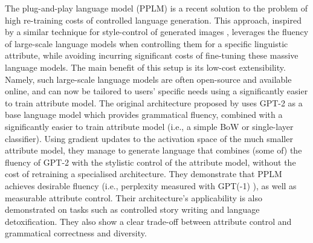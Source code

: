The plug-and-play language model (PPLM) \citep{dathathri2019plug} is a recent solution to the problem of high re-training costs of controlled language generation. This approach, inspired by a similar technique for style-control of generated images \citep{nguyen2017plug}, leverages the fluency of large-scale language models when controlling them for a specific linguistic attribute, while avoiding incurring significant costs of fine-tuning these massive language models. The main benefit of this setup is its low-cost extensibility. Namely, such large-scale language models are often open-source and available online, and can now be tailored to users' specific needs using a significantly easier to train attribute model. 
The original architecture proposed by \citeauthor{dathathri2019plug} uses GPT-2 as a base language model which provides grammatical fluency, combined with a significantly easier to train attribute model (i.e., a simple BoW or single-layer classifier). Using gradient updates to the activation space of the much smaller attribute model, they manage to generate language that combines (some of) the fluency of GPT-2 with the stylistic control of the attribute model, without the cost of retraining a specialised architecture. They demonstrate that PPLM achieves desirable fluency (i.e., perplexity measured with GPT(-1) \citep{radford2018improving}), as well as measurable attribute control. Their architecture's applicability is also demonstrated on tasks such as controlled story writing and language detoxification. They also show a clear trade-off between attribute control and grammatical correctness and diversity. 





